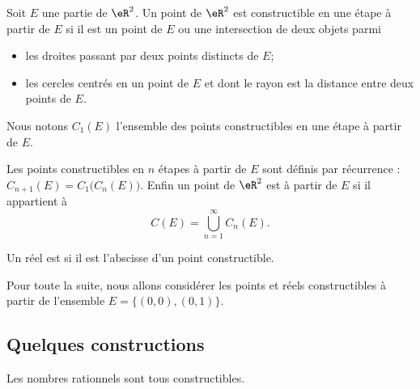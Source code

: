 \begin{definition}
	Soit \( E\) une partie de \( \eR^2\). Un point de \( \eR^2\) est constructible en une étape à partir de \( E\) si il est un point de \( E\) ou une intersection de deux objets parmi
	\begin{itemize}
		\item les droites passant par deux points distincts de \( E\);
		\item les cercles centrés en un point de \( E\) et dont le rayon est la distance entre deux points de \( E\).
	\end{itemize}
	Nous notons \( C_1(E)\) l'ensemble des points constructibles en une étape à partir de \( E\).

	Les points constructibles en \( n\) étapes à partir de \( E\) sont définis par récurrence : \( C_{n+1}(E)=C_1\big( C_n(E) \big)\). Enfin un point de \( \eR^2\) est  à partir de \( E\) si il appartient à
	\begin{equation}
		C(E)=\bigcup_{n=1}^{\infty}C_n(E).
	\end{equation}

	Un réel est  si il est l'abscisse d'un point constructible.
\end{definition}
Pour toute la suite, nous allons considérer les points et réels constructibles à partir de l'ensemble \( E=\{ (0,0),(0,1) \}\).

\subsection{Quelques constructions}

\begin{proposition}  \label{PropIMFooDWAyoH}
	Les nombres rationnels sont tous constructibles.
\end{proposition}

